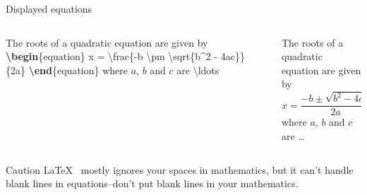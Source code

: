 \documentclass[,aspectratio=43]{beamer}
\newcommand{\VERB}{\Verb[commandchars=\\\{\}]}
\newenvironment{Shaded}{\begin{snugshade}}{\end{snugshade}}
\newcommand{\ExtensionTok}[1]{#1}
\newcommand{\FunctionTok}[1]{\textcolor[rgb]{0.02,0.16,0.49}{#1}}
\newcommand{\KeywordTok}[1]{\textcolor[rgb]{0.00,0.44,0.13}{\textbf{#1}}}
\newcommand{\NormalTok}[1]{#1}
\newcommand{\SpecialCharTok}[1]{\textcolor[rgb]{0.25,0.44,0.63}{#1}}
\newcommand{\SpecialStringTok}[1]{\textcolor[rgb]{0.73,0.40,0.53}{#1}}
\providecommand{\tightlist}{%
  \setlength{\itemsep}{0pt}\setlength{\parskip}{0pt}}
\begin{document}
\begin{frame}[fragile]{Displayed equations}

\begin{columns}[T]
\begin{column}{0.58\textwidth}
\small
\vspace{-1em}

\begin{Shaded}
\begin{Highlighting}[]
\NormalTok{The roots of a quadratic equation are}
\NormalTok{given by}
\KeywordTok{\textbackslash{}begin}\NormalTok{\{}\ExtensionTok{equation}\NormalTok{\}}
\SpecialStringTok{x = }\SpecialCharTok{\textbackslash{}frac}\SpecialStringTok{\{{-}b }\SpecialCharTok{\textbackslash{}pm}\SpecialStringTok{ }\SpecialCharTok{\textbackslash{}sqrt}\SpecialStringTok{\{b\^{}2 {-} 4ac\}\}}
\SpecialStringTok{         \{2a\}}
\KeywordTok{\textbackslash{}end}\NormalTok{\{}\ExtensionTok{equation}\NormalTok{\}}
\NormalTok{where }\SpecialStringTok{$a$}\NormalTok{, }\SpecialStringTok{$b$}\NormalTok{ and }\SpecialStringTok{$c$}\NormalTok{ are }\FunctionTok{\textbackslash{}ldots}
\end{Highlighting}
\end{Shaded}
\end{column}

\begin{column}{0.38\textwidth}
The roots of a quadratic equation are given by \begin{equation}
x = \frac{-b \pm \sqrt{b^2 - 4ac}}
{2a} \end{equation} where \(a\), \(b\) and \(c\) are \ldots
\end{column}
\end{columns}

\vspace{0.5em}

\begin{alertblock}{Caution}
\LaTeX~ mostly ignores your spaces in mathematics, but it can't handle
blank lines in equations--don't put blank lines in your mathematics.

\end{alertblock}
\end{frame}
\end{document}
